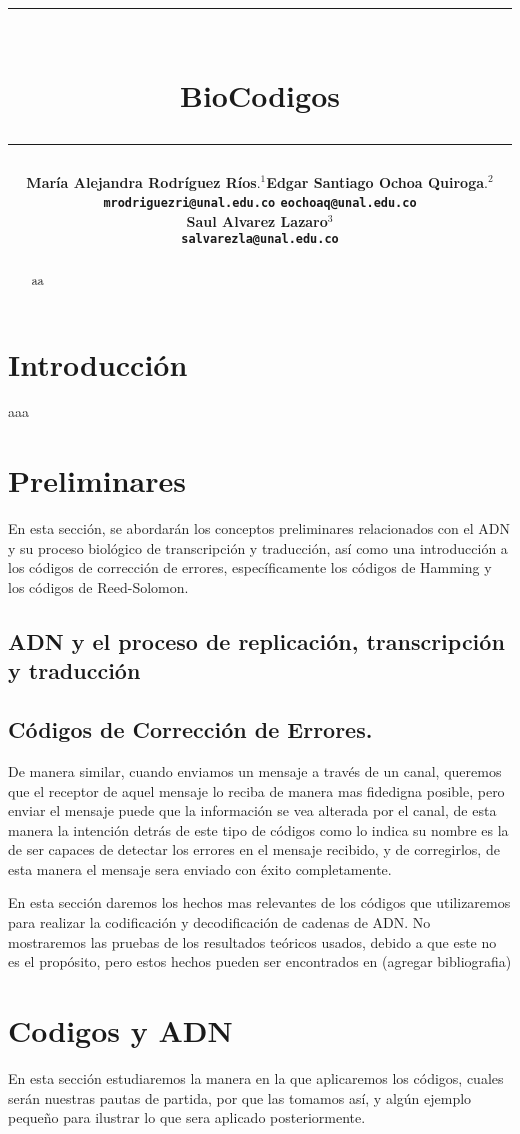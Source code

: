 \documentclass[12pt]{article}
\title{\vspace{-2cm}\par\noindent\rule{16cm}{1pt}\large
\\\bfseries BioCodigos
\vspace{-0.34cm}\par\noindent\hspace{0.15cm}\rule{16cm}{1pt}
\vspace{-0.6cm}
}
\author{\small \bfseries María Alejandra Rodríguez Ríos$.^1$\quad \quad\small Edgar Santiago Ochoa Quiroga$.^{2}$\\ \small \quad \texttt{mrodriguezri@unal.edu.co} \quad \quad \quad \quad \quad \quad \texttt{eochoaq@unal.edu.co}\quad\quad \quad\\ \small \bfseries Saul Alvarez Lazaro$^{3}$\\
\small \texttt{salvarezla@unal.edu.co}
}
\begin{document}
\maketitle
\begin{abstract}
aa
\end{abstract}

\section{Introducción}

aaa



\section{Preliminares}
En esta sección, se abordarán los conceptos preliminares relacionados con el ADN y su proceso biológico de transcripción y traducción, así como una introducción a los códigos de corrección de errores, específicamente los códigos de Hamming y los códigos de Reed-Solomon.
\subsection{ADN y el proceso de replicación, transcripción y traducción}

\subsection{Códigos de Corrección de Errores.}
De manera similar, cuando enviamos un mensaje a través de un canal, queremos que el receptor de aquel mensaje lo reciba de manera mas fidedigna posible, pero enviar el mensaje puede que la información se vea alterada por el canal, de esta manera la intención detrás de este tipo de códigos como lo indica su nombre es la de ser capaces de detectar los errores en el mensaje recibido, y de corregirlos, de esta manera el mensaje sera enviado con éxito completamente.

En esta sección daremos los hechos mas relevantes de los códigos que utilizaremos para realizar la codificación y decodificación de cadenas de ADN. No mostraremos las pruebas de los resultados teóricos usados, debido a que este no es el propósito, pero estos hechos pueden ser encontrados en (agregar bibliografia)


\section{Codigos y ADN}
En esta sección estudiaremos la manera en la que aplicaremos los códigos, cuales serán nuestras pautas de partida, por que las tomamos así, y algún ejemplo pequeño para ilustrar lo que sera aplicado posteriormente.








\nocite{*}
\end{document}

